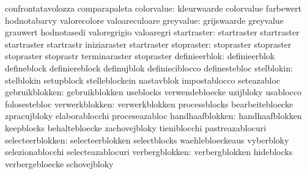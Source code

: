                                   confrontatavolozza               comparapaleta
                     colorvalue:  kleurwaarde                      colorvalue
                                  farbewert                        hodnotabarvy
                                  valorecolore                     valoareculoare
                      greyvalue:  grijswaarde                      greyvalue
                                  grauwert                         hodnotasedi
                                  valoregrigio                     valoaregri
                    startraster:  startraster                      startraster
                                  startraster                      startrastr
                                  iniziaraster                     startraster %
                     stopraster:  stopraster                       stopraster
                                  stopraster                       stoprastr
                                  terminaraster                    stopraster
                  definieerblok:  definieerblok                    defineblock
                                  definiereblock                   definujblok
                                  definisciblocco                  definestebloc
                     stelblokin:  stelblokin                       setupblock
                                  stelleblockein                   nastavblok
                                  impostablocco                    seteazabloc
                 gebruikblokken:  gebruikblokken                   useblocks
                                  verwendebloecke                  uzijbloky
                                  usablocco                        folosestebloc
                 verwerkblokken:  verwerkblokken                   processblocks
                                  bearbeitebloecke                 zpracujbloky
                                  elaborablocchi                   proceseazabloc
                handhaafblokken:  handhaafblokken                  keepblocks
                                  behaltebloecke                   zachovejbloky
                                  tieniblocchi                     pastreazablocuri
               selecteerblokken:  selecteerblokken                 selectblocks
                                  waehlebloeckeaus                 vyberbloky
                                  selezionablocchi                 selecteazablocuri
                 verbergblokken:  verbergblokken                   hideblocks
                                  verbergebloecke                  schovejbloky

